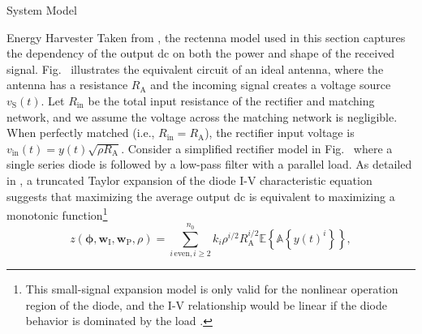 \begin{section}{System Model}
\begin{subsection}{Energy Harvester}
		Taken from \cite{Clerckx2016a}, the rectenna model used in this section captures the dependency of the output \gls{dc} on both the power and shape of the received signal. Fig.~ illustrates the equivalent circuit of an ideal antenna, where the antenna has a resistance $R_{\mathrm{A}}$ and the incoming signal creates a voltage source $v_{\mathrm{S}}(t)$. Let $R_{\mathrm{in}}$ be the total input resistance of the rectifier and matching network, and we assume the voltage across the matching network is negligible. When perfectly matched (i.e., $R_{\mathrm{in}}=R_{\mathrm{A}}$), the rectifier input voltage is $v_{\mathrm{in}}(t)=y(t)\sqrt{\rho R_{\mathrm{A}}}$. Consider a simplified rectifier model in Fig.~ where a single series diode is followed by a low-pass filter with a parallel load. As detailed in \cite{Clerckx2018b}, a truncated Taylor expansion of the diode I-V characteristic equation suggests that maximizing the average output \gls{dc} is equivalent to maximizing a monotonic function\footnote{This small-signal expansion model is only valid for the nonlinear operation region of the diode, and the I-V relationship would be linear if the diode behavior is dominated by the load \cite{Clerckx2016a}.}
		\begin{equation}\label{eq:z}
			z(\mathbf{\phi},\mathbf{w}_{\mathrm{I}},\mathbf{w}_{\mathrm{P}},\rho)=\sum_{i\,\mathrm{even},i\ge2}^{n_0}{k_i}{\rho^{i/2}}{R_{\mathrm{A}}^{i/2}}{\mathbb{E}\left\{\mathbb{A}\left\{y(t)^i\right\}\right\}},
		\end{equation}

\end{subsection}
\end{section}
